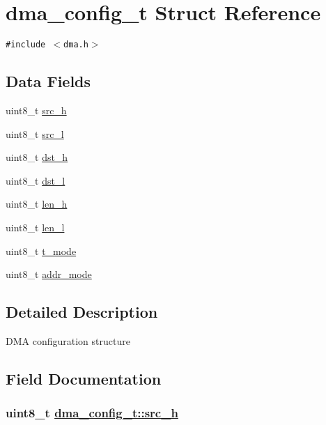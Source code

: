 \hypertarget{structdma__config__t}{
\section{dma\_\-config\_\-t Struct Reference}
\label{structdma__config__t}
}
{\tt \#include $<$dma.h$>$}

\subsection*{Data Fields}
\begin{CompactItemize}
\item 
uint8\_\-t \hyperlink{structdma__config__t_fb5908c7e14524a97700beaccd97ba53}{src\_\-h}
\item 
uint8\_\-t \hyperlink{structdma__config__t_df559811e53bbde7b6dc8cc6abb17e87}{src\_\-l}
\item 
uint8\_\-t \hyperlink{structdma__config__t_528a6d47caadb8b50b6bfa73444fb711}{dst\_\-h}
\item 
uint8\_\-t \hyperlink{structdma__config__t_ba26fe8bc8fc23929a766db7afe2e082}{dst\_\-l}
\item 
uint8\_\-t \hyperlink{structdma__config__t_c28c429f8e8b40eb50daf4994ecdf056}{len\_\-h}
\item 
uint8\_\-t \hyperlink{structdma__config__t_a4bfe298c22cedde28a40bd00d1db608}{len\_\-l}
\item 
uint8\_\-t \hyperlink{structdma__config__t_e41c35fc1ca1e6b7ddace92021656e4f}{t\_\-mode}
\item 
uint8\_\-t \hyperlink{structdma__config__t_ad91fc2dadb15a7a368fa2731f4a0e8b}{addr\_\-mode}
\end{CompactItemize}


\subsection{Detailed Description}
DMA configuration structure 



\subsection{Field Documentation}
\hypertarget{structdma__config__t_fb5908c7e14524a97700beaccd97ba53}{
\subsubsection[src\_\-h]{\setlength{\rightskip}{0pt plus 5cm}uint8\_\-t \hyperlink{structdma__config__t_fb5908c7e14524a97700beaccd97ba53}{dma\_\-config\_\-t::src\_\-h}}}
\label{structdma__config__t_fb5908c7e14524a97700beaccd97ba53}


